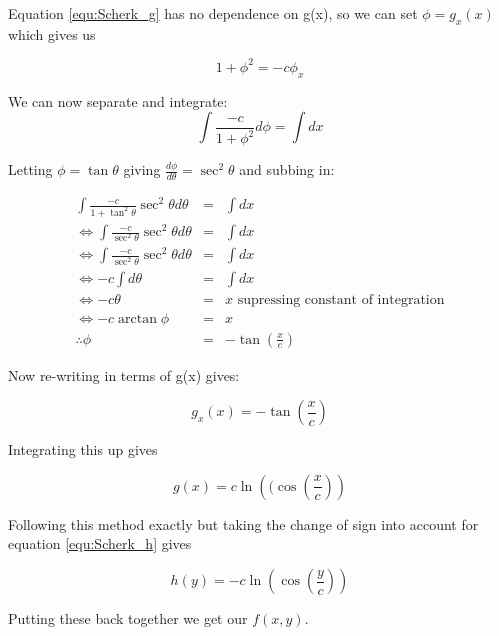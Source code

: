 Equation \ref{equ:Scherk_g} has no dependence on g(x), so we can set $\phi = g_x(x)$ which gives us

\begin{displaymath}
1+\phi^2 = -c\phi_x
\end{displaymath}

We can now separate and integrate:
\begin{displaymath}
\int\frac{-c}{1+\phi^2}d\phi = \int dx
\end{displaymath}

Letting $\phi = \tan \theta$ giving $\frac{d\phi}{d\theta} = \sec^2\theta$ and subbing in:

\begin{eqnarray}
\nonumber
\int\frac{-c}{1+\tan^2\theta}\sec^2\theta d\theta &=& \int dx \\
\nonumber
\Leftrightarrow \int\frac{-c}{\sec^2\theta}\sec^2\theta d\theta &=& \int dx \\
\nonumber
\Leftrightarrow \int\frac{-c}{\sec^2\theta}\sec^2\theta d\theta &=& \int dx \\
\nonumber
\Leftrightarrow -c\int d\theta &=& \int dx \\
\nonumber
\Leftrightarrow -c\theta &=& x \mbox{\ \ \ \ supressing constant of integration} \\
\nonumber
\Leftrightarrow -c \arctan \phi &=& x \\
\nonumber
\therefore \phi &=& -\tan\left(\frac{x}{c}\right)
\end{eqnarray}

Now re-writing in terms of g(x) gives:

\begin{displaymath}
g_x(x) = -\tan\left(\frac{x}{c}\right)
\end{displaymath}

Integrating this up gives

\begin{displaymath}
g(x) = c \ln\left((\cos \left(\frac{x}{c}\right)\right)
\end{displaymath}

Following this method exactly but taking the change of sign into account for equation \ref{equ:Scherk_h} gives

\begin{displaymath}
h(y) = -c \ln\left(\cos \left(\frac{y}{c}\right)\right)
\end{displaymath}
 
Putting these back together we get our $f(x,y)$.


